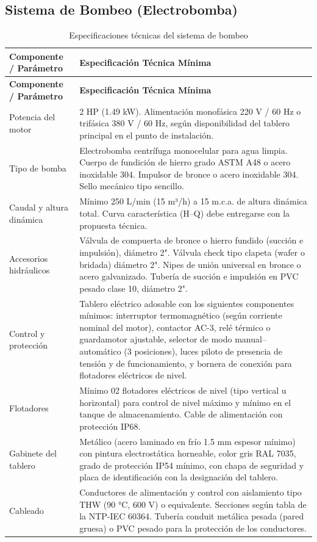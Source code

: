 \documentclass[12pt,a4paper]{article}
\begin{document}
\subsection{Sistema de Bombeo (Electrobomba)}

\begin{longtable}{L{4.5cm}p{10.5cm}}
  \caption{Especificaciones técnicas del sistema de bombeo}
  \label{tab:bomba}\\
  \toprule
  \textbf{Componente / Parámetro} & \textbf{Especificación Técnica Mínima} \\
  \midrule
  \endfirsthead
  \toprule
  \textbf{Componente / Parámetro} & \textbf{Especificación Técnica Mínima} \\
  \midrule
  \endhead
  Potencia del motor & 2 HP (1.49 kW). Alimentación monofásica 220 V / 60 Hz o trifásica 380 V / 60 Hz, según disponibilidad del tablero principal en el punto de instalación. \\
  Tipo de bomba & Electrobomba centrífuga monocelular para agua limpia. Cuerpo de fundición de hierro grado ASTM A48 o acero inoxidable 304. Impulsor de bronce o acero inoxidable 304. Sello mecánico tipo sencillo. \\
  Caudal y altura dinámica & Mínimo 250 L/min (15 m³/h) a 15 m.c.a. de altura dinámica total. Curva característica (H--Q) debe entregarse con la propuesta técnica. \\
  Accesorios hidráulicos & Válvula de compuerta de bronce o hierro fundido (succión e impulsión), diámetro 2". Válvula check tipo clapeta (wafer o bridada) diámetro 2". Nipes de unión universal en bronce o acero galvanizado. Tubería de succión e impulsión en PVC pesado clase 10, diámetro 2". \\
  Control y protección & Tablero eléctrico adosable con los siguientes componentes mínimos: interruptor termomagnético (según corriente nominal del motor), contactor AC-3, relé térmico o guardamotor ajustable, selector de modo manual--automático (3 posiciones), luces piloto de presencia de tensión y de funcionamiento, y bornera de conexión para flotadores eléctricos de nivel. \\
  Flotadores & Mínimo 02 flotadores eléctricos de nivel (tipo vertical u horizontal) para control de nivel máximo y mínimo en el tanque de almacenamiento. Cable de alimentación con protección IP68. \\
  Gabinete del tablero & Metálico (acero laminado en frío 1.5 mm espesor mínimo) con pintura electrostática horneable, color gris RAL 7035, grado de protección IP54 mínimo, con chapa de seguridad y placa de identificación con la designación del tablero. \\
  Cableado & Conductores de alimentación y control con aislamiento tipo THW (90 °C, 600 V) o equivalente. Secciones según tabla de la NTP-IEC 60364. Tubería conduit metálica pesada (pared gruesa) o PVC pesado para la protección de los conductores. \\
  \bottomrule
\end{longtable}
\end{document}
